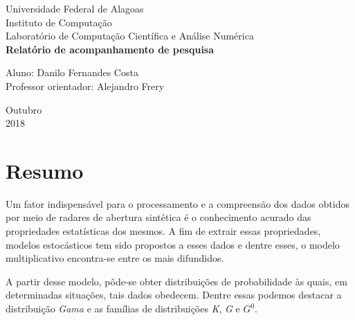 \documentclass[12pt]{article}
\begin{document}

\onehalfspacing

\begin{titlepage}
	\begin{center}

		\Huge{Universidade Federal de Alagoas}\\
		\large{Instituto de Computação}\\ 
		\large{Laboratório de Computação Científica e Análise Numérica}\\ 
        \vspace{220pt}
        \textbf{\LARGE{Relatório de acompanhamento de pesquisa}}\\
		\vspace{3,5cm}
	\end{center}
	
	\begin{flushleft}
		\begin{tabbing}
			Aluno: Danilo Fernandes Costa\\
			Professor orientador: Alejandro Frery\\
	\end{tabbing}
 \end{flushleft}
	\vspace{1cm}
	
	\begin{center}
		\vspace{\fill}
			 Outubro\\
		 2018
			\end{center}
\end{titlepage}

\section{Resumo}

Um fator indispensável para o processamento e a compreensão dos dados obtidos por meio de radares de abertura sintética é o conhecimento acurado das propriedades estatísticas dos mesmos. A fim de extrair essas propriedades, modelos estocásticos tem sido propostos a esses dados e dentre esses, o modelo multiplicativo encontra-se entre os mais difundidos.

A partir desse modelo, pôde-se obter distribuições de probabilidade às quais, em determinadas situações, tais dados obedecem. Dentre essas podemos destacar a distribuição \textit{Gama} e as famílias de distribuições \textit{K}, \textit{G} e $G^0$.
\end{document}
